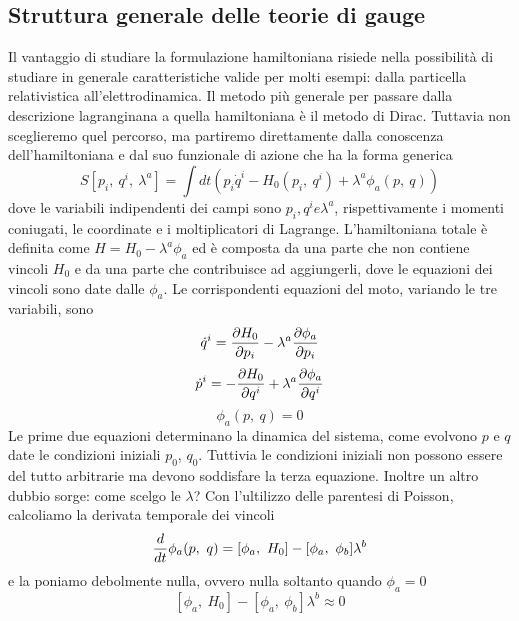 \subsection{Struttura generale delle teorie di gauge} 

    Il vantaggio di studiare la formulazione hamiltoniana risiede nella possibilità di studiare in generale caratteristiche valide per molti esempi: dalla particella relativistica all'elettrodinamica. Il metodo più generale per passare dalla descrizione lagranginana a quella hamiltoniana è il metodo di Dirac. Tuttavia non sceglieremo quel percorso, ma partiremo direttamente dalla conoscenza dell'hamiltoniana e dal suo funzionale di azione che ha la forma generica
\begin{equation} \label{azionevincolo}
    S[p_i,~q^i,~\lambda^a] = \int dt (p_i \dot q^i - H_0(p_i, ~q^i) + \lambda^a \phi_a (p, ~q))
\end{equation}
    dove le variabili indipendenti dei campi sono $p_i, q^i e \lambda^a$, rispettivamente i momenti coniugati, le coordinate e i moltiplicatori di Lagrange. L'hamiltoniana totale è definita come $H = H_0 - \lambda^a \phi_a$ ed è composta da una parte che non contiene vincoli $H_0$ e da una parte che contribuisce ad aggiungerli, dove le equazioni dei vincoli sono date dalle $\phi_a$. Le corrispondenti equazioni del moto, variando le tre variabili, sono
\begin{equation}
    \dot q^i = \frac{\partial H_0}{\partial p_i} - \lambda^a \frac{\partial\phi_a}{\partial p_i}
\end{equation}
\begin{equation}
    \dot p^i = - \frac{\partial H_0}{\partial q^i} + \lambda^a \frac{\partial\phi_a}{\partial q^i}
\end{equation}
\begin{equation}
    \phi_a(p, ~q) = 0
\end{equation}
    Le prime due equazioni determinano la dinamica del sistema, come evolvono $p$ e $q$ date le condizioni iniziali $p_0$, $q_0$. Tuttivia le condizioni iniziali non possono essere del tutto arbitrarie ma devono soddisfare la terza equazione. Inoltre un altro dubbio sorge: come scelgo le $\lambda$? Con l'ultilizzo delle parentesi di Poisson, calcoliamo la derivata temporale dei vincoli 
\begin{equation}
    \frac{d}{dt} \phi_a(p, ~q) = [\phi_a, ~H_0] - [\phi_a, ~\phi_b] \lambda^b
\end{equation}
    e la poniamo debolmente nulla, ovvero nulla soltanto quando $\phi_a = 0$
\begin{equation*} \label{vincoli}
    [\phi_a, ~H_0] - [\phi_a, ~\phi_b] \lambda^b \approx 0
\end{equation*}
